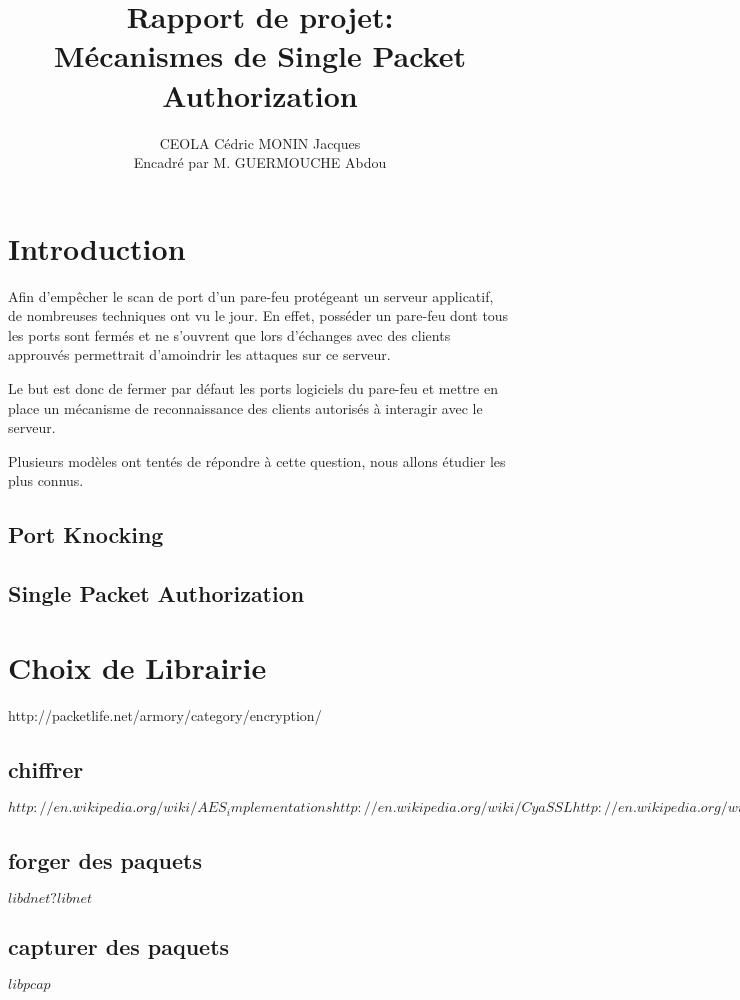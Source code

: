 \documentclass[12pt]{article}
\title{Rapport de projet:\\
Mécanismes de Single Packet Authorization}
\author{CEOLA Cédric MONIN Jacques\\
Encadré par M. GUERMOUCHE Abdou}
\begin{document}
\maketitle

\clearpage                  
\tableofcontents
\clearpage

\section{Introduction}

Afin d'empêcher le scan de port d'un pare-feu protégeant un serveur applicatif, de nombreuses techniques ont vu le jour. En effet, posséder un pare-feu dont tous les ports sont fermés et ne s'ouvrent que lors d'échanges avec des clients approuvés permettrait d'amoindrir les attaques sur ce serveur.

Le but est donc de fermer par défaut les ports logiciels du pare-feu et mettre en place un mécanisme de reconnaissance des clients autorisés à interagir avec le serveur.

Plusieurs modèles ont tentés de répondre à cette question, nous allons étudier les plus connus.

\subsection{Port Knocking}

\subsection{Single Packet Authorization}

 
\section{Choix de Librairie}

http://packetlife.net/armory/category/encryption/

\subsection{chiffrer}
$http://en.wikipedia.org/wiki/AES_implementations
http://en.wikipedia.org/wiki/CyaSSL
http://en.wikipedia.org/wiki/GnuTLS
http://en.wikipedia.org/wiki/PolarSSL
http://en.wikipedia.org/wiki/OpenSSL$

\subsection{forger des paquets}
$libdnet ?
libnet$

\subsection{capturer des paquets}
$libpcap$
\end{document}
